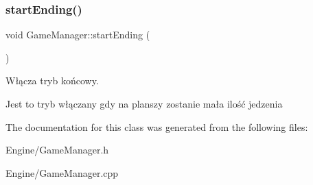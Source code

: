 \subsubsection{\texorpdfstring{start\+Ending()}{startEnding()}}
{\footnotesize\ttfamily void Game\+Manager\+::start\+Ending (\begin{DoxyParamCaption}{ }\end{DoxyParamCaption})}



Włącza tryb końcowy. 

Jest to tryb włączany gdy na planszy zostanie mała ilość jedzenia 

The documentation for this class was generated from the following files\+:\begin{DoxyCompactItemize}
\item 
Engine/Game\+Manager.\+h\item 
Engine/Game\+Manager.\+cpp\end{DoxyCompactItemize}
